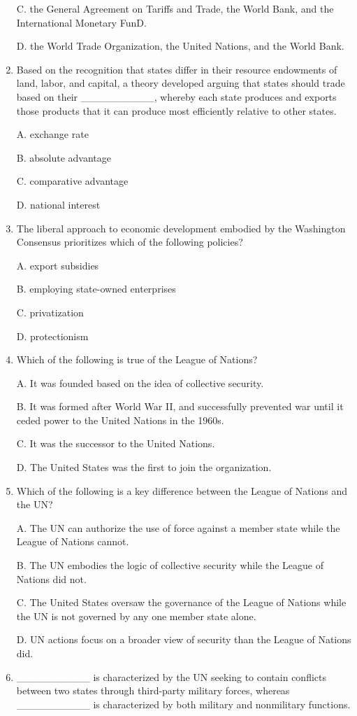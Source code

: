 \documentclass[
]{book}
\begin{document}
\begin{enumerate}
  C. the General Agreement on Tariffs and Trade, the World Bank, and the International Monetary FunD.

  D. the World Trade Organization, the United Nations, and the World Bank.
\item
  Based on the recognition that states differ in their resource endowments of land, labor, and capital, a theory developed arguing that states should trade based on their \_\_\_\_\_\_\_\_\_\_, whereby each state produces and exports those products that it can produce most efficiently relative to other states.

  A. exchange rate

  B. absolute advantage

  C. comparative advantage

  D. national interest
\item
  The liberal approach to economic development embodied by the Washington Consensus prioritizes which of the following policies?

  A. export subsidies

  B. employing state-owned enterprises

  C. privatization

  D. protectionism
\item
  Which of the following is true of the League of Nations?

  A. It was founded based on the idea of collective security.

  B. It was formed after World War II, and successfully prevented war until it ceded power to the United Nations in the 1960s.

  C. It was the successor to the United Nations.

  D. The United States was the first to join the organization.
\item
  Which of the following is a key difference between the League of Nations and the UN?

  A. The UN can authorize the use of force against a member state while the League of Nations cannot.

  B. The UN embodies the logic of collective security while the League of Nations did not.

  C. The United States oversaw the governance of the League of Nations while the UN is not governed by any one member state alone.

  D. UN actions focus on a broader view of security than the League of Nations did.
\item
  \_\_\_\_\_\_\_\_\_\_ is characterized by the UN seeking to contain conflicts between two states through third-party military forces, whereas \_\_\_\_\_\_\_\_\_\_ is characterized by both military and nonmilitary functions.


\end{enumerate}
\end{document}

